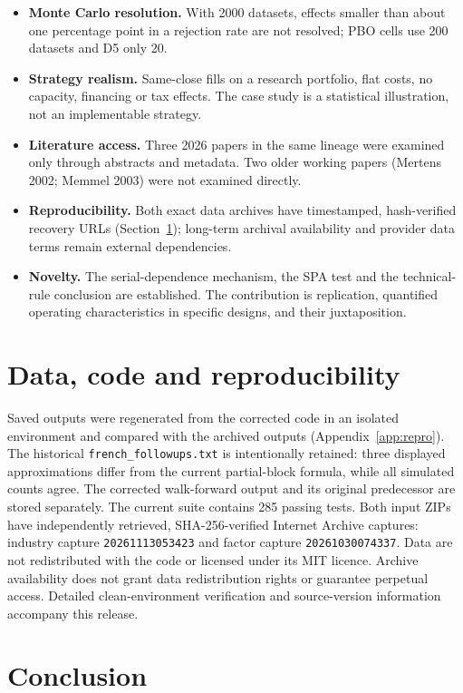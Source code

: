 \documentclass[11pt,a4paper]{article}
\theoremstyle{remark}
\begin{document}
\begin{itemize}
\item \textbf{Monte Carlo resolution.} With 2000 datasets, effects smaller than about one percentage point in a rejection rate are not resolved; PBO cells use 200 datasets and D5 only 20.
\item \textbf{Strategy realism.} Same-close fills on a research portfolio, flat costs, no capacity, financing or tax effects. The case study is a statistical illustration, not an implementable strategy.
\item \textbf{Literature access.} Three 2026 papers in the same lineage were examined only through abstracts and metadata. Two older working papers (Mertens 2002; Memmel 2003) were not examined directly.
\item \textbf{Reproducibility.} Both exact data archives have timestamped, hash-verified recovery URLs (Section~\ref{sec:repro}); long-term archival availability and provider data terms remain external dependencies.
\item \textbf{Novelty.} The serial-dependence mechanism, the SPA test and the technical-rule conclusion are established. The contribution is replication, quantified operating characteristics in specific designs, and their juxtaposition.
\end{itemize}

\section{Data, code and reproducibility}\label{sec:repro}

Saved outputs were regenerated from the corrected code in an isolated environment and compared with the archived outputs (Appendix~\ref{app:repro}). The historical \texttt{french\_followups.txt} is intentionally retained: three displayed approximations differ from the current partial-block formula, while all simulated counts agree. The corrected walk-forward output and its original predecessor are stored separately. The current suite contains 285 passing tests. Both input ZIPs have independently retrieved, SHA-256-verified Internet Archive captures: industry capture \texttt{20261113053423} and factor capture \texttt{20261030074337}. Data are not redistributed with the code or licensed under its MIT licence. Archive availability does not grant data redistribution rights or guarantee perpetual access. Detailed clean-environment verification and source-version information accompany this release.

\section{Conclusion}\label{sec:conclusion}
\end{document}
